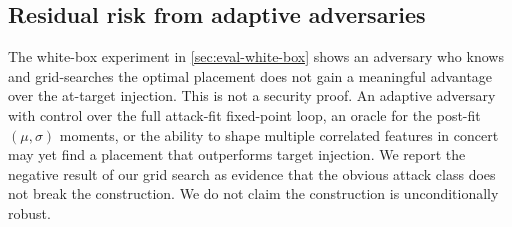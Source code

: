 \subsection{Residual risk from adaptive adversaries}

The white-box experiment in \cref{sec:eval-white-box} shows an
adversary who knows \trim{} and grid-searches the optimal placement
does not gain a meaningful advantage over the at-target injection.
This is not a security proof. An adaptive adversary with control
over the full attack-fit fixed-point loop, an oracle for the
post-fit $(\mu, \sigma)$ moments, or the ability to shape multiple
correlated features in concert may yet find a placement that
outperforms target injection. We report the negative result of our
grid search as evidence that the obvious attack class does not
break the construction. We do not claim the construction is
unconditionally robust.
